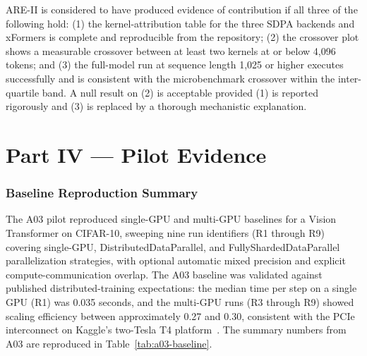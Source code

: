 \documentclass[11pt]{article}
\begin{document}
ARE-II is considered to have produced evidence of contribution if all three of the following hold: (1) the kernel-attribution table for the three SDPA backends and xFormers is complete and reproducible from the repository; (2) the crossover plot shows a measurable crossover between at least two kernels at or below 4{,}096 tokens; and (3) the full-model run at sequence length 1{,}025 or higher executes successfully and is consistent with the microbenchmark crossover within the inter-quartile band. A null result on (2) is acceptable provided (1) is reported rigorously and (3) is replaced by a thorough mechanistic explanation.

\newpage

\part*{Part IV --- Pilot Evidence}

\section{Baseline Reproduction Summary}

The A03 pilot reproduced single-GPU and multi-GPU baselines for a Vision Transformer on CIFAR-10, sweeping nine run identifiers (R1 through R9) covering single-GPU, DistributedDataParallel, and FullyShardedDataParallel parallelization strategies, with optional automatic mixed precision and explicit compute-communication overlap. The A03 baseline was validated against published distributed-training expectations: the median time per step on a single GPU (R1) was 0.035 seconds, and the multi-GPU runs (R3 through R9) showed scaling efficiency between approximately 0.27 and 0.30, consistent with the PCIe interconnect on Kaggle's two-Tesla T4 platform~\parencite{vaswani2023attentionneed}. The summary numbers from A03 are reproduced in Table~\ref{tab:a03-baseline}.
\end{document}
